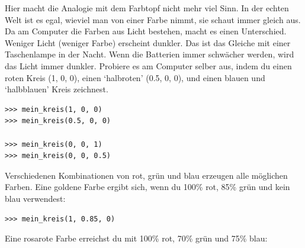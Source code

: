 Hier macht die Analogie mit dem Farbtopf nicht mehr viel Sinn. In der echten Welt ist es egal, wieviel man von einer Farbe nimmt, sie schaut immer gleich aus. Da am Computer die Farben aus Licht bestehen, macht es einen Unterschied. Weniger Licht (weniger Farbe) erscheint dunkler. Das ist das Gleiche mit einer Taschenlampe in der Nacht. Wenn die Batterien immer schwächer werden, wird das Licht immer dunkler. Probiere es am Computer selber aus, indem du einen roten Kreis (1, 0, 0), einen `halbroten' (0.5, 0, 0), und einen blauen und `halbblauen' Kreis zeichnest.


\begin{Verbatim}[frame=single]
>>> mein_kreis(1, 0, 0)
>>> mein_kreis(0.5, 0, 0)

>>> mein_kreis(0, 0, 1)
>>> mein_kreis(0, 0, 0.5)
\end{Verbatim}

\noindent
Verschiedenen Kombinationen von rot, grün und blau erzeugen alle möglichen Farben. Eine goldene Farbe ergibt sich, wenn du 100\% rot, 85\% grün und kein blau verwendest:

\begin{Verbatim}[frame=single]
>>> mein_kreis(1, 0.85, 0)
\end{Verbatim}

\noindent
Eine rosarote Farbe erreichst du mit 100\% rot, 70\% grün und 75\% blau:

